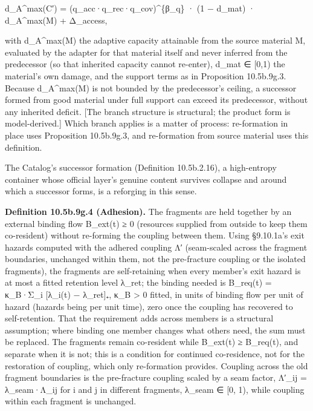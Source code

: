 \documentclass[
]{article}
\begin{document}
d\_A\^{}max(C′) = (q\_acc·q\_rec·q\_cov)\^{}\{β\_q\} · (1 − d\_mat) ·
d\_A\^{}max(M) + Δ\_access,

with d\_A\^{}max(M) the adaptive capacity attainable from the source
material M, evaluated by the adapter for that material itself and never
inferred from the predecessor (so that inherited capacity cannot
re-enter), d\_mat ∈ {[}0,1) the material's own damage, and the support
terms as in Proposition 10.5b.9g.3. Because d\_A\^{}max(M) is not
bounded by the predecessor's ceiling, a successor formed from good
material under full support can exceed its predecessor, without any
inherited deficit. {[}The branch structure is structural; the product
form is model-derived.{]} Which branch applies is a matter of process:
re-formation in place uses Proposition 10.5b.9g.3, and re-formation from
source material uses this definition.

The Catalog's successor formation (Definition 10.5b.2.16), a
high-entropy container whose official layer's genuine content survives
collapse and around which a successor forms, is a reforging in this
sense.

\textbf{Definition 10.5b.9g.4 (Adhesion).} The fragments are held
together by an external binding flow B\_ext(t) ≥ 0 (resources supplied
from outside to keep them co-resident) without re-forming the coupling
between them. Using §9.10.1a's exit hazards computed with the adhered
coupling Λ′ (seam-scaled across the fragment boundaries, unchanged
within them, not the pre-fracture coupling or the isolated
fragments\textquotesingle), the fragments are self-retaining when every
member's exit hazard is at most a fitted retention level λ\_ret; the
binding needed is B\_req(t) = κ\_B·Σ\_i {[}λ\_i(t) − λ\_ret{]}₊, κ\_B
\textgreater{} 0 fitted, in units of binding flow per unit of hazard
(hazards being per unit time), zero once the coupling has recovered to
self-retention. That the requirement adds across members is a structural
assumption; where binding one member changes what others need, the sum
must be replaced. The fragments remain co-resident while B\_ext(t) ≥
B\_req(t), and separate when it is not; this is a condition for
continued co-residence, not for the restoration of coupling, which only
re-formation provides. Coupling across the old fragment boundaries is
the pre-fracture coupling scaled by a seam factor, Λ′\_ij =
λ\_seam·Λ\_ij for i and j in different fragments, λ\_seam ∈ {[}0, 1),
while coupling within each fragment is unchanged.
\end{document}
